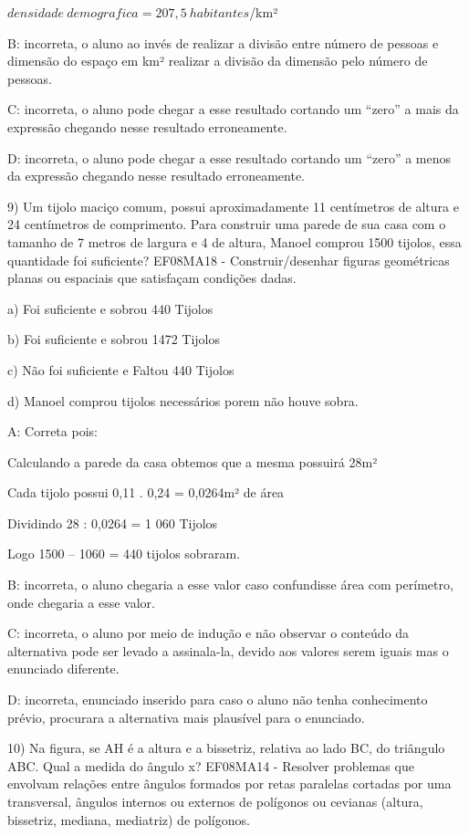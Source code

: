 {\(densidade\ demografica = 207,5\ habitantes\)/km²

B: incorreta, o aluno ao invés de realizar a divisão entre número de
pessoas e dimensão do espaço em km² realizar a divisão da dimensão pelo
número de pessoas.

C: incorreta, o aluno pode chegar a esse resultado cortando um ``zero''
a mais da expressão chegando nesse resultado erroneamente.

D: incorreta, o aluno pode chegar a esse resultado cortando um ``zero''
a menos da expressão chegando nesse resultado erroneamente.

9) Um tijolo maciço comum, possui aproximadamente 11 centímetros de
altura e 24 centímetros de comprimento. Para construir uma parede de sua
casa com o tamanho de 7 metros de largura e 4 de altura, Manoel comprou
1500 tijolos, essa quantidade foi suficiente? EF08MA18 -
Construir/desenhar figuras geométricas planas ou espaciais que
satisfaçam condições dadas.

a) Foi suficiente e sobrou 440 Tijolos

b) Foi suficiente e sobrou 1472 Tijolos

c) Não foi suficiente e Faltou 440 Tijolos

d) Manoel comprou tijolos necessários porem não houve sobra.

A: Correta pois:

Calculando a parede da casa obtemos que a mesma possuirá 28m²

Cada tijolo possui 0,11 . 0,24 = 0,0264m² de área

Dividindo 28 : 0,0264 = 1 060 Tijolos

Logo 1500 -- 1060 = 440 tijolos sobraram.

B: incorreta, o aluno chegaria a esse valor caso confundisse área com
perímetro, onde chegaria a esse valor.

C: incorreta, o aluno por meio de indução e não observar o conteúdo da
alternativa pode ser levado a assinala-la, devido aos valores serem
iguais mas o enunciado diferente.

D: incorreta, enunciado inserido para caso o aluno não tenha
conhecimento prévio, procurara a alternativa mais plausível para o
enunciado.

10) Na figura, se AH é a altura e a bissetriz, relativa ao lado BC, do
triângulo ABC. Qual a medida do ângulo x? EF08MA14 - Resolver problemas
que envolvam relações entre ângulos formados por retas paralelas
cortadas por uma transversal, ângulos internos ou externos de polígonos
ou cevianas (altura, bissetriz, mediana, mediatriz) de polígonos.

}
